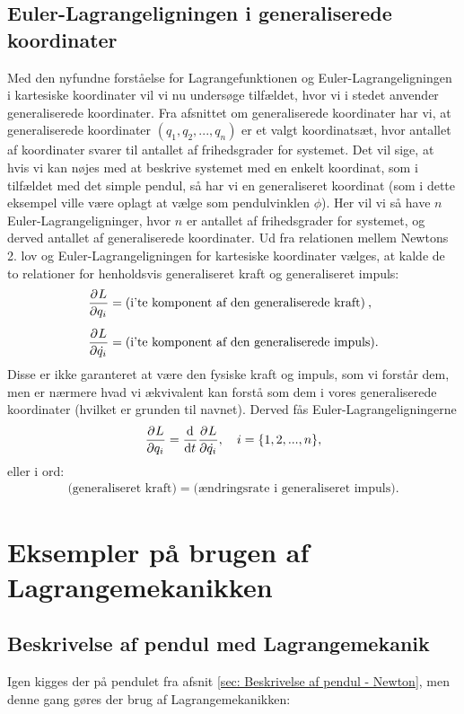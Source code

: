 \subsection*{Euler-Lagrangeligningen i generaliserede koordinater}
Med den nyfundne forståelse for Lagrangefunktionen og Euler-Lagrangeligningen i kartesiske koordinater vil vi nu undersøge tilfældet, hvor vi i stedet anvender generaliserede koordinater. Fra afsnittet om generaliserede koordinater har vi, at generaliserede koordinater $(q_1,q_2,...,q_n)$ er et valgt koordinatsæt, hvor antallet af koordinater svarer til antallet af frihedsgrader for systemet. Det vil sige, at hvis vi kan nøjes med at beskrive systemet med en enkelt koordinat, som i tilfældet med det simple pendul, så har vi en generaliseret koordinat (som i dette eksempel ville være oplagt at vælge som pendulvinklen $\phi$). Her vil vi så have $n$ Euler-Lagrangeligninger, hvor $n$ er antallet af frihedsgrader for systemet, og derved antallet af generaliserede koordinater. Ud fra relationen mellem Newtons 2. lov og Euler-Lagrangeligningen for kartesiske koordinater vælges, at kalde de to relationer for henholdsvis generaliseret kraft og generaliseret impuls:
\begin{align}
	\pdif{q_i}{L} &= \text{(i'te komponent af den generaliserede kraft)} \: , \\[.5em]
	\pdif{\dt{q_i}}{L} &= \text{(i'te komponent af den generaliserede impuls)}.
\end{align}
Disse er ikke garanteret at være den fysiske kraft og impuls, som vi forstår dem, men er nærmere hvad vi ækvivalent kan forstå som dem i vores generaliserede koordinater (hvilket er grunden til navnet). Derved fås Euler-Lagrangeligningerne
%
\begin{align}\label{Euler-Lagrange}
	\pdif{q_i}{L} = \dif{t}{} \pdif{\dt{q_i}}{L}, \quad i = \{1,2,...,n\},
\end{align}
%
eller i ord:
%
\begin{align}
	\text{(generaliseret kraft)} = \text{(ændringsrate i generaliseret impuls)}.
\end{align}

\section{Eksempler på brugen af Lagrangemekanikken}
\subsection{Beskrivelse af pendul med Lagrangemekanik} \label{sec:PendulLagrange}
Igen kigges der på pendulet fra afsnit \ref{sec: Beskrivelse af pendul - Newton}, men denne gang gøres der brug af Lagrangemekanikken:

